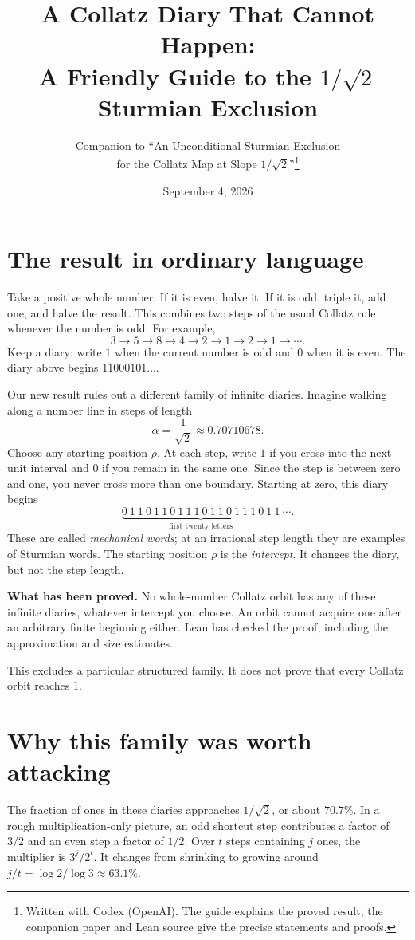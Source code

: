 \documentclass[11pt]{article}
\title{A Collatz Diary That Cannot Happen:\\
\Large A Friendly Guide to the $1/\sqrt2$ Sturmian Exclusion}
\author{Companion to ``An Unconditional Sturmian Exclusion\\for the Collatz Map at Slope $1/\sqrt2$''\thanks{Written with Codex (OpenAI). The guide explains the proved result; the companion paper and Lean source give the precise statements and proofs.}}
\date{September 4, 2026}
\begin{document}
\maketitle

\section{The result in ordinary language}
Take a positive whole number. If it is even, halve it. If it is odd,
triple it, add one, and halve the result. This combines two steps of the
usual Collatz rule whenever the number is odd. For example,
\[
3\longrightarrow5\longrightarrow8\longrightarrow4
\longrightarrow2\longrightarrow1\longrightarrow2\longrightarrow1\longrightarrow\cdots.
\]
Keep a diary: write $1$ when the current number is odd and $0$ when it is
even. The diary above begins $11000101\ldots$.

Our new result rules out a different family of infinite diaries. Imagine
walking along a number line in steps of length
\[
\alpha=\frac1{\sqrt2}\approx0.70710678.
\]
Choose any starting position $\rho$. At each step, write $1$ if you cross
into the next unit interval and $0$ if you remain in the same one. Since
the step is between zero and one, you never cross more than one boundary.
Starting at zero, this diary begins
\[
\underbrace{0\ 1\ 1\ 0\ 1\ 1\ 0\ 1\ 1\ 1\ 0\ 1\ 1\ 0\ 1\ 1\ 1\ 0\ 1\ 1}_{\text{first twenty letters}}\ \cdots.
\]
These are called \emph{mechanical words}; at an irrational step length
they are examples of Sturmian words. The starting position $\rho$ is the
\emph{intercept}. It changes the diary, but not the step length.

\begin{keyidea}
\textbf{What has been proved.} No whole-number Collatz orbit has any of
these infinite diaries, whatever intercept you choose. An orbit cannot
acquire one after an arbitrary finite beginning either. Lean has checked
the proof, including the approximation and size estimates.
\end{keyidea}
This excludes a particular structured family. It does not prove that
every Collatz orbit reaches $1$.

\newpage
\section{Why this family was worth attacking}
The fraction of ones in these diaries approaches $1/\sqrt2$, or about
$70.7\%$. In a rough multiplication-only picture, an odd shortcut step
contributes a factor of $3/2$ and an even step a factor of $1/2$. Over
$t$ steps containing $j$ ones, the multiplier is $3^j/2^t$. It changes
from shrinking to growing around $j/t=\log2/\log3\approx63.1\%$.
\end{document}
